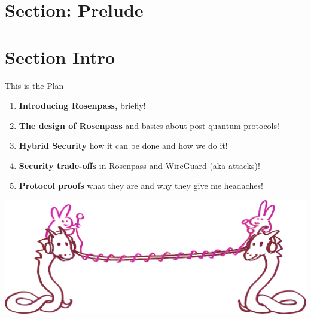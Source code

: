 \hypertarget{section-prelude}{%
\section{Section: Prelude}\label{section-prelude}}

\hypertarget{section-intro}{%
\section{Section Intro}\label{section-intro}}



\begin{frame}[s]{This is the Plan}
  \hypertarget{todays-talk}{}
  \begin{enumerate}
   \setlength{\itemsep}{1ex plus 1 fil}
    \item \textbf{Introducing Rosenpass,} briefly!
    \item \textbf{The design of Rosenpass} and basics about post-quantum protocols!
    \item \textbf{Hybrid Security} how it can be done and how we do it!
    \item \textbf{Security trade-offs} in Rosenpass and WireGuard (aka attacks)!
    \item \textbf{Protocol proofs} what they are and why they give me headaches!
  \end{enumerate}

  \begin{center}
    \includegraphics[height=.3\textheight]{graphics/wireguard-and-rp-bunny-rose.png}
  \end{center}
\end{frame}



